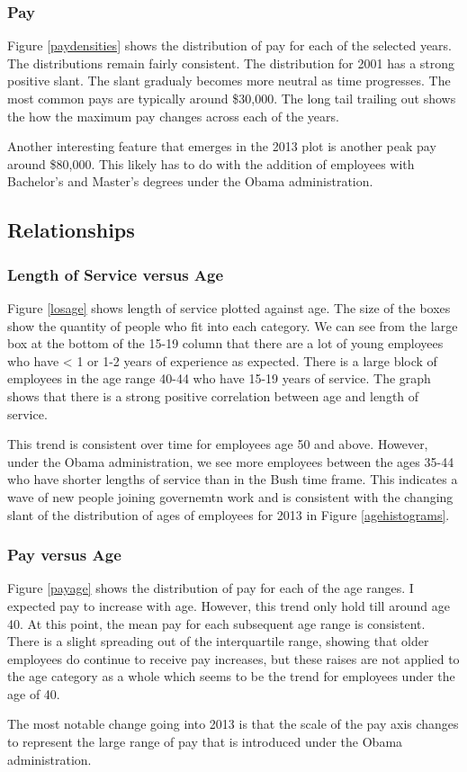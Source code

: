 \documentclass{article}
\begin{document}
        \subsubsection{Pay}
        Figure \ref{paydensities} shows the distribution of pay for each of the selected years. The distributions remain fairly consistent. The distribution for 2001 has a strong positive slant. The slant gradualy becomes more neutral as time progresses. The most common pays are typically around \$30,000. The long tail trailing out shows the how the maximum pay changes across each of the years.
        \par
        Another interesting feature that emerges in the 2013 plot is another peak pay around \$80,000. This likely has to do with the addition of employees with Bachelor's and Master's degrees under the Obama administration.

    \subsection{Relationships}

        \subsubsection{Length of Service versus Age}
        Figure \ref{losage} shows length of service plotted against age. The size of the boxes show the quantity of people who fit into each category. We can see from the large box at the bottom of the 15-19 column that there are a lot of young employees who have < 1 or 1-2 years of experience as expected. There is a large block of employees in the age range 40-44 who have 15-19 years of service. The graph shows that there is a strong positive correlation between age and length of service.
        \par
        This trend is consistent over time for employees age 50 and above. However, under the Obama administration, we see more employees between the ages 35-44 who have shorter lengths of service than in the Bush time frame. This indicates a wave of new people joining governemtn work and is consistent with the changing slant of the distribution of ages of employees for 2013 in Figure \ref{agehistograms}.

        \subsubsection{Pay versus Age}
        Figure \ref{payage} shows the distribution of pay for each of the age ranges. I expected pay to increase with age. However, this trend only hold till around age 40. At this point, the mean pay for each subsequent age range is consistent. There is a slight spreading out of the interquartile range, showing that older employees do continue to receive pay increases, but these raises are not applied to the age category as a whole which seems to be  the trend for employees under the age of 40.
        \par
        The most notable change going into 2013 is that the scale of the pay axis changes to represent the large range of pay that is introduced under the Obama administration.
\end{document}
